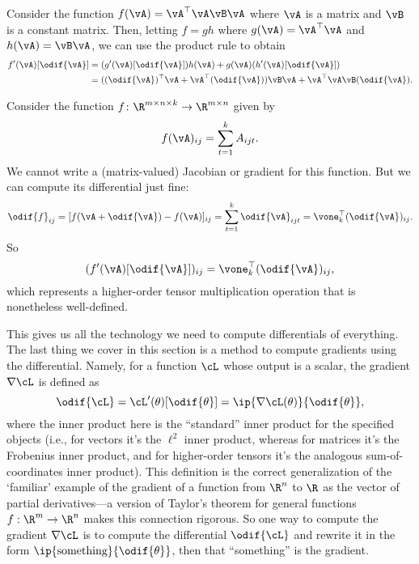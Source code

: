 \documentclass[../../book-main.tex]{subfiles}
\begin{document}
\begin{example}
    Consider the function \(f(\vA) = \vA^{\top}\vA\vB\vA\) where \(\vA\) is a matrix and \(\vB\) is a constant matrix. Then, letting \(f = gh\) where \(g(\vA) = \vA^{\top}\vA\) and \(h(\vA) = \vB\vA\), we can use the product rule to obtain 
    \begin{align}
        f^{\prime}(\vA)[\odif{\vA}]
        &= (g^{\prime}(\vA)[\odif{\vA}])h(\vA) + g(\vA)(h^{\prime}(\vA)[\odif{\vA}]) \\
        &= ((\odif{\vA})^{\top}\vA + \vA^{\top}(\odif{\vA}))\vB\vA + \vA^{\top}\vA\vB(\odif{\vA}).
    \end{align}
\end{example}

\begin{example}
    Consider the function \(f \colon \R^{m \times n \times k} \to \R^{m \times n}\) given by 
    \begin{equation}
        f(\vA)_{ij} = \sum_{t = 1}^{k}A_{ijt}.
    \end{equation}
    We cannot write a (matrix-valued) Jacobian or gradient for this function. But we can compute its differential just fine:
    \begin{equation}
        \odif{f}_{ij} = [f(\vA + \odif{\vA}) - f(\vA)]_{ij} = \sum_{t = 1}^{k}\odif{\vA}_{ijt} = \vone_{k}^{\top}(\odif{\vA})_{ij}.
    \end{equation}
    So 
    \begin{equation}
        (f^{\prime}(\vA)[\odif{\vA}])_{ij} = \vone_{k}^{\top}(\odif{\vA})_{ij},
    \end{equation}
    which represents a higher-order tensor multiplication operation that is nonetheless well-defined.
\end{example}

This gives us all the technology we need to compute differentials of everything.
The last thing we cover in this section is a method to compute gradients using
the differential. Namely, for a function \(\cL\) whose output is a scalar, the
gradient \(\nabla \cL\) is defined as 
\begin{equation}
    \odif{\cL} = \cL^{\prime}(\theta)[\odif{\theta}] = \ip{\nabla \cL(\theta)}{\odif{\theta}},
\end{equation}
where the inner product here is the ``standard'' inner product for the specified objects (i.e., for vectors it's the \(\ell^{2}\) inner product, whereas for matrices it's the Frobenius inner product, and for higher-order tensors it's the analogous sum-of-coordinates inner product). 
This definition is the correct generalization of the `familiar' example of the
gradient of a function from $\R^n$ to $\R$ as the vector of partial
derivatives---a version of Taylor's theorem for general functions $f : \R^m \to
\R^n$ makes this connection rigorous.
So one way to compute the gradient \(\nabla \cL\) is to compute the differential
\(\odif{\cL}\) and rewrite it in the form
\(\ip{\text{something}}{\odif{\theta}}\), then that ``something'' is the
gradient.
\end{document}

